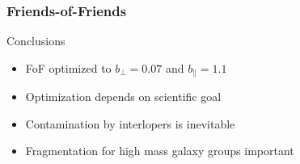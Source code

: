 \begin{frame}
    \frametitle{Friends-of-Friends}
    \begin{block}{Conclusions}
        \begin{itemize}
            \item<1-> FoF optimized to $b_\bot=0.07$ and $b_\parallel=1.1$
            \item<2-> Optimization depends on scientific goal
            \item<3-> Contamination by interlopers is inevitable
            \item<4-> Fragmentation for high mass galaxy groups important
        \end{itemize}
    \end{block}
\end{frame}

